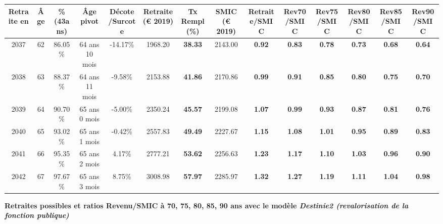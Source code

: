 \begin{adjustbox}{max width=\textwidth} 
\begin{tabular}[htb]{|c|c||c|c|c||c|c||c||c|c|c|c|c|c|} 
\hline 
 Retraite en &  Âge &  \%(43ans) &  Âge pivot &  Décote/Surcote &  Retraite (\euro{} 2019) &  Tx Rempl(\%) &  SMIC (\euro{} 2019) &  Retraite/SMIC &  Rev70/SMIC &  Rev75/SMIC &  Rev80/SMIC &  Rev85/SMIC &  Rev90/SMIC \\ 
\hline \hline 
 2037 &  62 &  86.05\% &  64 ans 10 mois &  -14.17\% &  1968.20 &  {\bf 38.33} &  2143.00 &  {\bf {\color{red} 0.92}} &  {\bf {\color{red} 0.83}} &  {\bf {\color{red} 0.78}} &  {\bf {\color{red} 0.73}} &  {\bf {\color{red} 0.68}} &  {\bf {\color{red} 0.64}} \\ 
\hline 
 2038 &  63 &  88.37\% &  64 ans 11 mois &  -9.58\% &  2153.88 &  {\bf 41.86} &  2170.86 &  {\bf {\color{red} 0.99}} &  {\bf {\color{red} 0.91}} &  {\bf {\color{red} 0.85}} &  {\bf {\color{red} 0.80}} &  {\bf {\color{red} 0.75}} &  {\bf {\color{red} 0.70}} \\ 
\hline 
 2039 &  64 &  90.70\% &  65 ans 0 mois &  -5.00\% &  2350.24 &  {\bf 45.57} &  2199.08 &  {\bf 1.07} &  {\bf {\color{red} 0.99}} &  {\bf {\color{red} 0.93}} &  {\bf {\color{red} 0.87}} &  {\bf {\color{red} 0.81}} &  {\bf {\color{red} 0.76}} \\ 
\hline 
 2040 &  65 &  93.02\% &  65 ans 1 mois &  -0.42\% &  2557.83 &  {\bf 49.49} &  2227.67 &  {\bf 1.15} &  {\bf 1.08} &  {\bf 1.01} &  {\bf {\color{red} 0.95}} &  {\bf {\color{red} 0.89}} &  {\bf {\color{red} 0.83}} \\ 
\hline 
 2041 &  66 &  95.35\% &  65 ans 2 mois &  4.17\% &  2777.21 &  {\bf 53.62} &  2256.63 &  {\bf 1.23} &  {\bf 1.17} &  {\bf 1.10} &  {\bf 1.03} &  {\bf {\color{red} 0.96}} &  {\bf {\color{red} 0.90}} \\ 
\hline 
 2042 &  67 &  97.67\% &  65 ans 3 mois &  8.75\% &  3008.98 &  {\bf 57.97} &  2285.97 &  {\bf 1.32} &  {\bf 1.27} &  {\bf 1.19} &  {\bf 1.11} &  {\bf 1.04} &  {\bf {\color{red} 0.98}} \\ 
\hline 
\hline 
\end{tabular} 
\end{adjustbox} 
 
 \vspace{0.1cm} 
{\bf \noindent Retraites possibles et ratios Revenu/SMIC à 70, 75, 80, 85, 90 ans avec le modèle \emph{Destinie2 (revalorisation de la fonction publique)}}  
 
